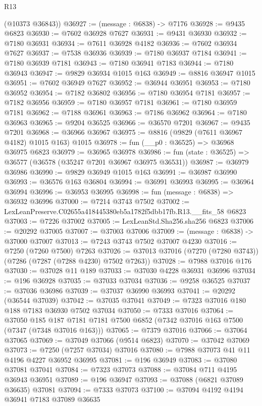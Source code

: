 \begin{lexlean}{R13}
\begin{coremodule}
      (@10373 @36843))
@36927 := (message : @6838) -> @7176
@36928 := @9435 @6823
@36930 := @7602 @36928 @7627
@36931 := @9431 @36930
@36932 := @7180 @36931
@36934 := @7611 @36928 @4182
@36936 := @7602 @36934 @7627
@36937 := @7538 @36936
@36939 := @7180 @36937 @7184
@36941 := @7180 @36939 @7181
@36943 := @7180 @36941 @7183
@36944 := @7180 @36943
@36947 := @9829 @36934 @1015 @163
@36949 := @8816 @36947 @1015
@36951 := @7602 @36949 @7627
@36952 := @36944 @36951
@36953 := @7180 @36952
@36954 := @7182 @36802
@36956 := @7180 @36954 @7181
@36957 := @7182 @36956
@36959 := @7180 @36957 @7181
@36961 := @7180 @36959 @7181
@36962 := @7188 @36961
@36963 := @7186 @36962
@36964 := @7180 @36963
@36965 := @9204 @36525
@36966 := @36570 @7201
@36967 := @9435 @7201
@36968 := @36966 @36967
@36975 := @8816 (@9829 (@7611 @36967 @4182) @1015 @163) @1015
@36978 := fun (__p0 : @36525) => @36968 @36975 @6823
@36979 := @36965 @36978
@36986 := fun (state : @36525) => @36577 (@36578 (@35247 @7201 @36967 @36975 @36531))
@36987 := @36979 @36986
@36990 := @9829 @36949 @1015 @163
@36991 := @36987 @36990
@36993 := @36576 @163 @36804
@36994 := @36991 @36993
@36995 := @36964 @36994
@36996 := @36953 @36995
@36998 := fun (message : @6838) => @36932 @36996
@37000 := @7214 @3743 @7502
@37002 := LexLeanPreserve.C02655a418445380eb5a1782f5dbb17fb.R13.__fits_58 @6823
@37003 := @7226 @37002
@37005 := LexLeanStd.Sha256.sha256 @6823
@37006 := @20292 @37005
@37007 := @37003 @37006
@37009 := (message : @6838) -> @37000 @37007
@37013 := @7243 @3743 @7502 @37007 @4230
@37016 := @7250 (@7260 @7500) @7263
@37026 := @37013 @37016 (@7270 (@7280 @3743)) (@7286 (@7287 (@7288 @4230) @7502 @7263))
@37028 := @7988 @37016 @176
@37030 := @37028 @11 @189
@37033 := @37030 @4228 @36931 @36996
@37034 := @196 @36928
@37035 := @37033 @37034
@37036 := @9258 @36525
@37037 := @37036 @36986
@37039 := @37037 @36990 @36993
@37041 := @20292 (@36544 @37039)
@37042 := @37035 @37041
@37049 := @7323 @37016 @180 @188 @7183 @36930 @7502 @37034
@37050 := @7333 @37016
@37064 := @37050
    @185
    @187
    @7181
    @7181
    @7500
    @6852
    (@7342 @37016 @163 @7500 (@7347 (@7348 @37016 @163)))
@37065 := @7379 @37016
@37066 := @37064 @37065
@37069 := @37049 @37066 (@9514 @6823)
@37070 := @37042 @37069
@37073 := @7250 (@7257 @37034) @37016
@37080 := @7988 @37073 @41 @11 @4196 @4227 @36952 @36995
@37081 := @196 @36949
@37083 := @37080 @37081 @37041
@37084 := @7323 @37073
@37088 := @37084 @711 @4195 @36943 @36951
@37089 := @196 @36947
@37093 := @37088 (@6821 @37089 @36635) @37081
@37094 := @7333 @37073
@37100 := @37094 @4192 @4194 @36941 @7183 @37089 @36635

\end{coremodule}
\end{lexlean}
